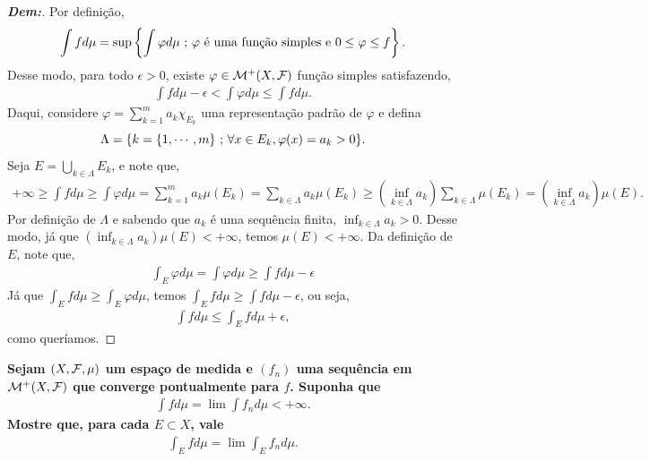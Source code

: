 \begin{proof}[\textbf{Dem:}]
Por definição, 
\begin{align*}
  \int f d\mu = \sup \left\{\int \varphi d\mu \text{ ; } \varphi \text{ é uma função simples 
  e } 0 \le \varphi \le f\right\}.
\end{align*}
  Desse modo, para todo $\epsilon > 0$, existe $\varphi \in \mathcal M^+(X, \mathcal F)$
  função simples satisfazendo,
\begin{align*}
  \int f d\mu - \epsilon < \int \varphi d\mu \le \int f d\mu.
\end{align*}
  Daqui, considere $\varphi = \sum_{k=1}^m a_k \chi_{E_k}$ uma representação padrão 
  de $\varphi$ e defina 
  $$\Lambda = \{k = \{1, \cdots, m\} \text{ ; } \forall x \in E_k, \varphi(x) = a_k > 0\}.$$
  Seja $E = \bigcup\limits_{k \in \Lambda} E_k$, e note que, 
  \begin{align*}
    +\infty \ge \int f d\mu \ge \int \varphi d\mu = \sum_{k = 1}^m a_k \mu(E_k) 
    = \sum_{k \in \Lambda} a_k \mu(E_k) \ge
    (\inf_{k \in \Lambda} a_k) \sum_{k \in \Lambda} \mu(E_k) = (\inf_{k \in \Lambda} a_k) \mu(E).
  \end{align*}
  Por definição de $\Lambda$ e sabendo que ${a_k}$ é uma sequência finita, 
  $\inf_{k \in \Lambda} a_k > 0$. Desse modo, já que 
  $(\inf_{k \in \Lambda} a_k) \mu(E) < +\infty$, temos $\mu(E) < +\infty$.
  Da definição de $E$, note que, 
  \begin{align*}
    \int_E \varphi d\mu = \int \varphi d\mu \ge \int f d\mu - \epsilon
  \end{align*}
  Já que $\int_E f d\mu \ge \int_E \varphi d\mu$, temos 
  $\int_E f d\mu \ge \int f d\mu - \epsilon$, ou seja, 
  \begin{align*}
    \int f d\mu \le \int_E f d\mu + \epsilon,
  \end{align*}
  como queríamos.
\end{proof}
\biglinend 
\newpage
{}
\myexe{\thetres}
\bigline
\textbf{Sejam $(X, \mathcal F, \mu)$ um espaço de medida e $(f_n)$ uma sequência 
em $\mathcal M^+ (X, \mathcal F)$ que converge pontualmente para $f$. Suponha que 
\begin{align*}
  \int f d\mu = \lim \int f_n d\mu < +\infty.
\end{align*}
Mostre que, para cada $E \subset X$, vale 
\begin{align*}
  \int_E f d\mu = \lim \int_E f_n d\mu.
\end{align*}
}
